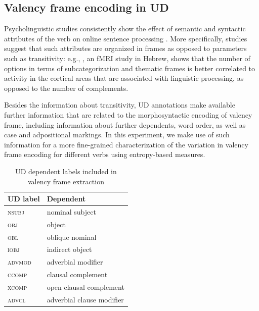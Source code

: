 \subsection{Valency frame encoding in UD}

Psycholinguistic studies consistently show the effect of semantic and syntactic attributes of the verb on online sentence processing \citep{shapiro1987,collina2001}. More specifically, studies suggest that such attributes are organized in frames as opposed to parameters such as transitivity: e.g., \citet{shetreet2007}, an fMRI study in Hebrew, shows that the number of options in terms of subcategorization and thematic frames is better correlated to activity in the cortical areas that are associated with linguistic processing, as opposed to the number of complements.

Besides the information about transitivity, UD annotations make available further information that are related to the morphosyntactic encoding of valency frame, including information about further dependents, word order, as well as case and adpositional markings. In this experiment, we make use of such information for a more fine-grained characterization of the variation in valency frame encoding for different verbs using entropy-based measures.

\begin{table}
  \centering
  \begin{tabular}{ll}
    \toprule
    \textbf{UD label} & \textbf{Dependent} \\
    \midrule
    \textsc{nsubj} & nominal subject \\
    \textsc{obj} & object \\
    \midrule
    \textsc{obl} & oblique nominal \\
    \textsc{iobj} & indirect object \\
    \textsc{advmod} & adverbial modifier \\
    \textsc{ccomp} & clausal complement \\
    \textsc{xcomp} & open clausal complement \\
    \textsc{advcl} & adverbial clause modifier \\
    \bottomrule
  \end{tabular}
  \caption{UD dependent labels included in valency frame extraction}\label{tab:ud-dependent-labels}
\end{table}

